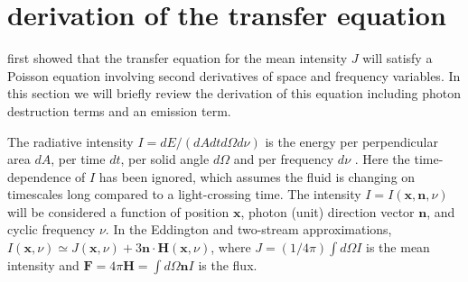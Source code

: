 \documentclass{aastex63}
\renewcommand{\vec}[1]{\mathbf{#1}}
\begin{document}
\acknowledgments




\appendix

\section{ derivation of the transfer equation }

\citet{1973MNRAS.162...43H} first showed that the transfer equation for the mean  intensity $J$ will satisfy a Poisson equation involving second derivatives of space and frequency variables. In this section we will briefly review the derivation of this equation including photon destruction terms and an emission term.

The radiative intensity $I = dE/(dA dt d\Omega d\nu)$ is the energy per perpendicular area $dA$, per time $dt$, per solid angle $d\Omega$ and per frequency $d\nu$ \citep{1986rpa..book.....R}. Here the time-dependence of $I$ has been ignored, which assumes the fluid is changing on timescales long compared to a light-crossing time. The intensity $I=I(\vec{x},\vec{n}, \nu)$ will be considered a function of position $\vec{x}$, photon (unit) direction vector $\vec{n}$, and cyclic frequency $\nu$. In the Eddington and two-stream approximations, $I(\vec{x},\nu) \simeq J(\vec{x},\nu) + 3 \vec{n} \cdot \vec{H}(\vec{x},\nu)$, where $J=(1/4\pi) \int d\Omega I$ is the mean intensity and $\vec{F} = 4\pi \vec{H}= \int d\Omega \vec{n} I$ is the flux.  
\end{document}
